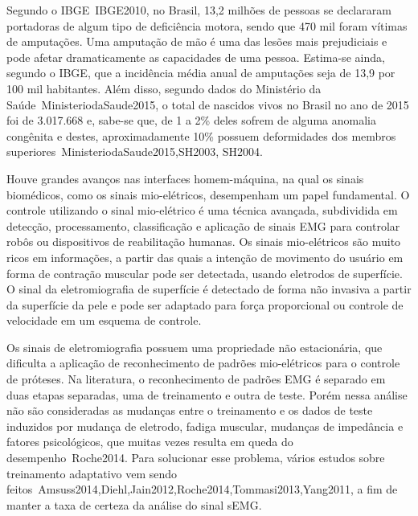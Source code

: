 \documentclass[a4paper, 12pt]{ppgeb}
\begin{document}
Segundo o IBGE~\cite{resumoestendido}{IBGE2010}, no Brasil, 13,2 milhões de pessoas se declararam portadoras de algum tipo de deficiência motora, sendo que 470 mil foram vítimas de amputações. Uma amputação de mão é uma das lesões mais prejudiciais e pode afetar dramaticamente as capacidades de uma pessoa. Estima-se ainda, segundo o IBGE, que a incidência média anual de amputações seja de 13,9 por 100 mil habitantes. Além disso, segundo dados do Ministério da Saúde~\cite{resumoestendido}{MinisteriodaSaude2015}, o total de nascidos vivos no Brasil no ano de 2015 foi de 3.017.668 e, sabe-se que, de 1 a 2\% deles sofrem de alguma anomalia congênita e destes, aproximadamente 10\% possuem deformidades dos membros superiores~\cite{resumoestendido}{MinisteriodaSaude2015,SH2003, SH2004}.

Houve grandes avanços nas interfaces homem-máquina, na qual os sinais biomédicos, como os sinais mio-elétricos, desempenham um papel fundamental. O controle utilizando o sinal mio-elétrico é uma técnica avançada, subdividida em detecção, processamento, classificação e aplicação de sinais EMG para controlar robôs ou dispositivos de reabilitação humanas. Os sinais mio-elétricos são muito ricos em informações, a partir das quais a intenção de movimento do usuário em forma de contração muscular pode ser detectada, usando eletrodos de superfície. O sinal da eletromiografia de superfície é detectado de forma não invasiva a partir da superfície da pele e pode ser adaptado para força proporcional ou controle de velocidade em um esquema de controle.

Os sinais de eletromiografia possuem uma propriedade não estacionária, que dificulta a aplicação de reconhecimento de padrões mio-elétricos para o controle de próteses. Na literatura, o reconhecimento de padrões EMG é separado em duas etapas separadas, uma de treinamento e outra de teste. Porém nessa análise não são consideradas as mudanças entre o treinamento e os dados de teste induzidos por mudança de eletrodo, fadiga muscular, mudanças de impedância e fatores psicológicos, que muitas vezes resulta em queda do desempenho~\cite{resumoestendido}{Roche2014}. Para solucionar esse problema, vários estudos sobre treinamento adaptativo vem sendo feitos~\cite{resumoestendido}{Amsuss2014,Diehl,Jain2012,Roche2014,Tommasi2013,Yang2011}, a fim de manter a taxa de certeza da análise do sinal sEMG.
\end{document}
